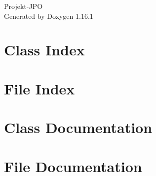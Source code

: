 \documentclass[twoside]{book}
\newcommand{\+}{\discretionary{\mbox{\scriptsize$\hookleftarrow$}}{}{}}
\newcommand{\clearemptydoublepage}{%
    \newpage{\pagestyle{empty}\cleardoublepage}%
  }
\begin{document}
  \raggedbottom
    \hypersetup{pageanchor=false,
                bookmarksnumbered=true,
                pdfencoding=unicode
               }
  \begin{titlepage}
  \vspace*{7cm}
  \begin{center}%
  {\Large Projekt-\/\+JPO}\\
  \vspace*{1cm}
  {\large Generated by Doxygen 1.16.1}\\
  \end{center}
  \end{titlepage}
  \clearemptydoublepage
  \tableofcontents
  \clearemptydoublepage
  \hypersetup{pageanchor=true}
\chapter{Class Index}

\chapter{File Index}

\chapter{Class Documentation}




\chapter{File Documentation}




  \backmatter
  \newpage
  \clearemptydoublepage
  \printindex
\end{document}
